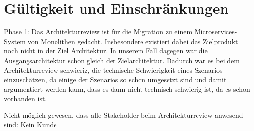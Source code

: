 \chapter{Gültigkeit und Einschränkungen}
\label{chap:gueltigkeit}

Phase 1:
Das Architekturreview ist für die Migration zu einem Microservices-System von Monolithen gedacht.
Insbesondere existiert dabei das Zielprodukt noch nicht in der Ziel Architektur. 
In unserem Fall dagegen war die Ausgangsarchitektur schon gleich der Zielarchitektur.
Dadurch war es bei dem Architekturreview schwierig, die technische Schwierigkeit eines Szenarios einzuschätzen, da einige der Szenarios so schon umgesetzt sind und damit argumentiert werden kann, dass es dann nicht technisch schwierig ist, da es schon vorhanden ist.

Nicht möglich gewesen, dass alle Stakeholder beim Architekturreview anwesend sind: Kein Kunde  


